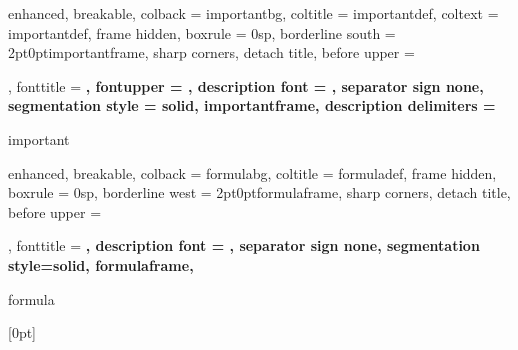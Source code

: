 {%
  enhanced,
  breakable,
  colback = importantbg,
  coltitle = importantdef,
  coltext = importantdef,
  frame hidden,
  boxrule = 0sp,
  borderline south = {2pt}{0pt}{importantframe},
  sharp corners,
  detach title,
  before upper = \tcbtitle\par\smallskip,
  fonttitle = \selectfont\bfseries,
  fontupper = \selectfont\bfseries,
  description font = \mdseries,
  separator sign none,
  segmentation style = {solid, importantframe},
  description delimiters = {\flqq}{\frqq}
}
{important}

\newcommand{\imp}[1]
{%
  \begin{Important*}{Important}{}
    #1
  \end{Important*}
}%



{%
  enhanced,
  breakable,
  colback = formulabg,
  coltitle = formuladef,
  frame hidden,
  boxrule = 0sp,
  borderline west = {2pt}{0pt}{formulaframe},
  sharp corners,
  detach title,
  before upper = \tcbtitle\par\smallskip,
  fonttitle = \bfseries\sffamily,
  description font = \mdseries,
  separator sign none,
  segmentation style={solid, formulaframe},
}
{formula}

\newcommand{\formula}[2]
{%
  \begin{Formula}{#1}{}
    #2
  \end{Formula}
}%

[0pt]{\normalsize\bfseries\protect\addvspace{15pt}}%
{}{\partname{} }%
{\enspace\titlerule\contentspage}%
